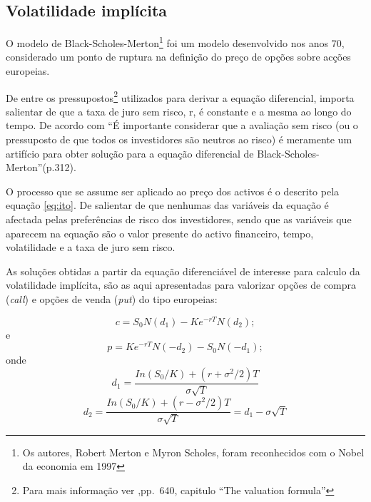 \documentclass[
  12pt,
  a4paper,
  openany]{book}
\begin{document}
\hypertarget{volatilidade-impluxedcita}{%
\subsection{Volatilidade implícita}\label{volatilidade-impluxedcita}}

O modelo de Black-Scholes-Merton\footnote{Os autores, Robert Merton e Myron Scholes, foram reconhecidos com o Nobel da economia em 1997} foi um modelo desenvolvido nos anos 70, considerado um ponto de ruptura na definição do preço de opções sobre acções europeias.

De entre os pressupostos\footnote{Para mais informação ver \citet{BlackScholes},pp.~640, capitulo ``The valuation formula''} utilizados para derivar a equação diferencial, importa salientar de que a taxa de juro sem risco, r, é constante e a mesma ao longo do tempo. De acordo com \citet{Hull2018} ``É importante considerar que a avaliação sem risco (ou o pressuposto de que todos os investidores são neutros ao risco) é meramente um artifício para obter solução para a equação diferencial de Black-Scholes-Merton''(p.312).

O processo que se assume ser aplicado ao preço dos activos é o descrito pela equação \eqref{eq:ito}. De salientar de que nenhumas das variáveis da equação é afectada pelas preferências de risco dos investidores, sendo que as variáveis que aparecem na equação são o valor presente do activo financeiro, tempo, volatilidade e a taxa de juro sem risco.

As soluções obtidas a partir da equação diferenciável de interesse para calculo da volatilidade implícita, são as aqui apresentadas para valorizar opções de compra (\emph{call}) e opções de venda (\emph{put}) do tipo europeias:

\begin{equation} 
  c = S_0N(d_1) - Ke^{-rT}N(d_2);
  \label{eq:call}
\end{equation}
e
\begin{equation} 
  p = Ke^{-rT}N(-d_2) - S_0N(-d_1);
  \label{eq:put}
\end{equation}
onde
\begin{equation} 
  d_1 = \frac{In(S_0/K)+(r+\sigma^2/2)T}{\sigma\sqrt{T}}
  \label{eq:d1}
\end{equation}
\begin{equation} 
  d_2 = \frac{In(S_0/K)+(r-\sigma^2/2)T}{\sigma\sqrt{T}}=d_1-\sigma\sqrt{T}
  \label{eq:d2}
\end{equation}
\end{document}
